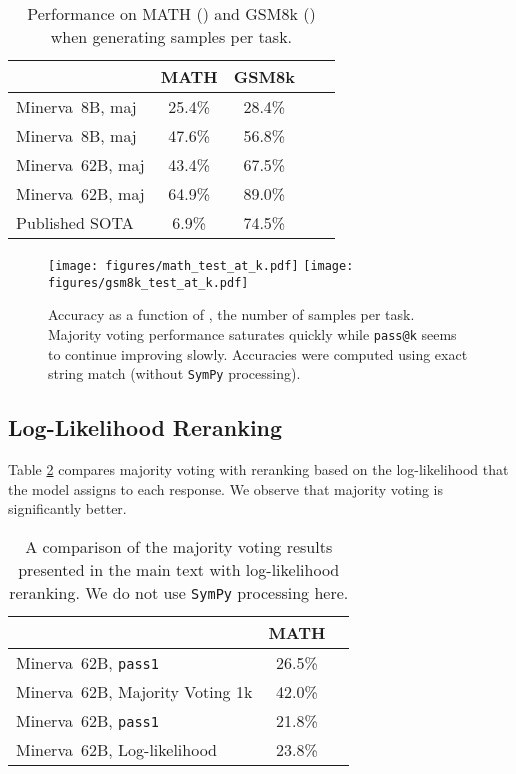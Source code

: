 \documentclass{article}
\makeatletter
\newcommand{\ourmodel}[0]{{Minerva~}}
\newcommand{\passk}[0]{{\texttt{pass@k} }}
\makeatother
\begin{document}
\begin{table}[ht!]
\caption{Performance on MATH () and GSM8k () when generating  samples per task.}
\label{tab:higher_metrics}
\begin{center}
\begin{tabular}{lcccc}
\toprule
  & MATH  & GSM8k  \\ 
\midrule
\ourmodel 8B, maj       & 25.4\%                  & 28.4\% \\
\ourmodel 8B, maj       & 47.6\%                   & 56.8\%  \\
\ourmodel 62B, maj      & 43.4\%                  & 67.5\% \\
\ourmodel 62B, maj      & 64.9\%         & 89.0\% \\
\midrule
Published SOTA                      & 6.9\%   & 74.5\%  \\
\bottomrule
\end{tabular}
\end{center}
\end{table}


\begin{figure}[ht]
\begin{center}
\texttt{[image: figures/math\_test\_at\_k.pdf]}
\texttt{[image: figures/gsm8k\_test\_at\_k.pdf]}
\caption{Accuracy as a function of , the number of samples per task. Majority voting performance saturates quickly while \passk seems to continue improving slowly. Accuracies were computed using exact string match (without \texttt{SymPy} processing).}
\label{fig:math_62B_majority_topk}
\end{center}
\end{figure}


\subsection{Log-Likelihood Reranking}
\label{appendix:loglikelihood}
Table \ref{adv_inference_table} compares majority voting with reranking based on the log-likelihood that the model assigns to each response. We observe that majority voting is significantly better.

\begin{table}[ht!]
\caption{A comparison of the majority voting results presented in the  main text with log-likelihood reranking. We do not use \texttt{SymPy} processing here.
}
\label{adv_inference_table}
\begin{center}
\begin{tabular}{lcc}
\toprule
  & MATH  \\
\midrule
\ourmodel 62B, \texttt{pass1}   & 26.5\% \\ 
\ourmodel 62B, Majority Voting 1\text{@}k & 42.0\%  \\
\ourmodel 62B, \texttt{pass1}   & 21.8\% \\ 
\ourmodel 62B, Log-likelihood  & 23.8\% \\ 
\bottomrule
\end{tabular}
\end{center}
\end{table}
\end{document}
